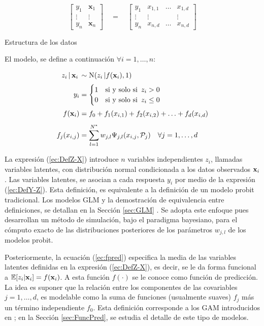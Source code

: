 \documentclass[../Main/Main.tex]{subfiles}
\begin{document}
\begin{table}[H]
$$
\left[\begin{array}{c|c} 
y_1 & \mathbf{x}_1 \\ 
\vdots & \vdots \\ 
y_n & \mathbf{x}_n \end{array}\right] 
\quad = \quad
\left[\begin{array}{c|ccc} 
y_1 & x_{1,1} & \ldots & x_{1,d} \\ 
\vdots & \vdots & ~ & \vdots \\ 
y_n & x_{n,d} & \ldots & x_{n,d}
\end{array}\right]
$$
\caption{Estructura de los datos}
\label{tab:datos}
\end{table}

El modelo, se define a continuación $\forall i = 1,\ldots,n$:

\begin{align}
z_i\,|\,\mathbf{x}_i\, &\sim \text{N}(z_i\,|f(\mathbf{x}_i),1)\quad \label{ec:DefZ-X} \\[2pt]
y_i &= 
	\begin{cases}
		1 & \text{si y solo si }\, z_i > 0 \\									0 & \text{si y solo si }\, z_i \leq 0
	\end{cases} \label{ec:DefY-Z} \\[2pt]
f(\mathbf{x}_i) &= f_0 + f_1(x_{i,1}) + f_2(x_{i,2}) + \ldots + f_d(x_{i,d}) \label{ec:fpred} \\[4pt]
f_j(x_{i,j}) &= \sum_{l = 1}^{N^*} w_{j,l} \Psi_{j,l}(x_{i,j}, \mathcal{P}_j) \quad \forall j = 1,\ldots,d \label{ec:fj}
\end{align}	

La expresión (\ref{ec:DefZ-X}) introduce $n$ variables independientes $z_i$, llamadas variables latentes, con distribución normal condicionada a los datos observados $\mathbf{x}_i$. Las variables latentes, se asocian a cada respuesta $y_i$ por medio de la expresión (\ref{ec:DefY-Z}). Esta definición, es equivalente a la definición de un modelo probit tradicional. Los modelos GLM y la demostración de equivalencia entre definiciones, se detallan en la Sección \ref{sec:GLM} \autocite{maccullagh1989generalized, sundberg2016exponential}. Se adopta este enfoque pues \citet{albert1993bayesian} desarrollan un método de simulación, bajo el paradigma bayesiano, para el cómputo exacto de las distribuciones posteriores de los parámetros $w_{j,l}$ de los modelos probit.
 
Posteriormente, la ecuación (\ref{ec:fpred}) especifica la media de las variables latentes definidas en la expresión (\ref{ec:DefZ-X}), es decir, se le da forma funcional a $\mathbb{E}[z_i|\mathbf{x}_i] = f(\mathbf{x}_i)$. A esta función $f(\cdot)$ se le conoce como función de predicción. La idea es suponer que la relación entre los componentes de las covariables $j = 1,\ldots,d$, es modelable como la suma de funciones (usualmente suaves) $f_j$ más un término independiente $f_0$. Esta definición corresponde a los GAM introducidos en \citet{hastie1986generalized}; en la Sección \ref{sec:FuncPred}, se estudia el detalle de este tipo de modelos.
\end{document}
